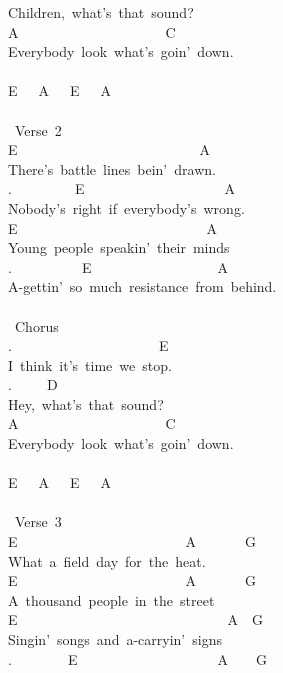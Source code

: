 {Children,\ what's\ that\ sound?\\
A\ \ \ \ \ \ \ \ \ \ \ \ \ \ \ \ \ \ \ \ \ C\\
Everybody\ look\ what's\ goin'\ down.\\
\\
E\ \ \ A\ \ \ E\ \ \ A\\
\\
\lbrack\ Verse\ 2\rbrack\\
E\ \ \ \ \ \ \ \ \ \ \ \ \ \ \ \ \ \ \ \ \ \ \ \ \ \ A\\
There's\ battle\ lines\ bein'\ drawn.\\
.\ \ \ \ \ \ \ \ \ E\ \ \ \ \ \ \ \ \ \ \ \ \ \ \ \ \ \ \ \ A\\
Nobody's\ right\ if\ everybody's\ wrong.\\
E\ \ \ \ \ \ \ \ \ \ \ \ \ \ \ \ \ \ \ \ \ \ \ \ \ \ \ A\\
Young\ people\ speakin'\ their\ minds\\
.\ \ \ \ \ \ \ \ \ \ E\ \ \ \ \ \ \ \ \ \ \ \ \ \ \ \ \ \ A\\
A-gettin'\ so\ much\ resistance\ from\ behind.\\
\\
\lbrack\ Chorus\rbrack\\
.\ \ \ \ \ \ \ \ \ \ \ \ \ \ \ \ \ \ \ \ \ E\\
I\ think\ it's\ time\ we\ stop.\\
.\ \ \ \ \ D\\
Hey,\ what's\ that\ sound?\\
A\ \ \ \ \ \ \ \ \ \ \ \ \ \ \ \ \ \ \ \ \ C\\
Everybody\ look\ what's\ goin'\ down.\\
\\
E\ \ \ A\ \ \ E\ \ \ A\\
\\
\lbrack\ Verse\ 3\rbrack\\
E\ \ \ \ \ \ \ \ \ \ \ \ \ \ \ \ \ \ \ \ \ \ \ \ A\ \ \ \ \ \ \ G\\
What\ a\ field\ day\ for\ the\ heat.\\
E\ \ \ \ \ \ \ \ \ \ \ \ \ \ \ \ \ \ \ \ \ \ \ \ A\ \ \ \ \ \ \ G\\
A\ thousand\ people\ in\ the\ street\\
E\ \ \ \ \ \ \ \ \ \ \ \ \ \ \ \ \ \ \ \ \ \ \ \ \ \ \ \ \ \ A\ \ G\\
Singin'\ songs\ and\ a-carryin'\ signs\\
.\ \ \ \ \ \ \ \ E\ \ \ \ \ \ \ \ \ \ \ \ \ \ \ \ \ \ \ \ A\ \ \ \ G\\
}

